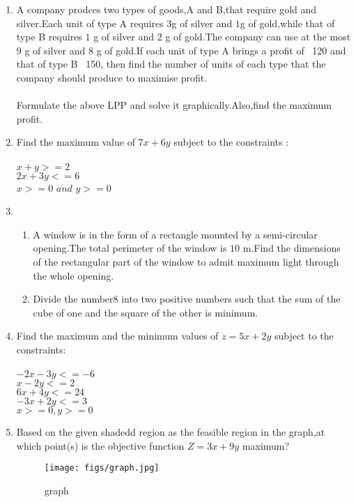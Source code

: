 \documentclass{article}
\begin{document}
\begin{enumerate} 
 \item A company prodces two types of goods,A and B,that require gold and silver.Each unit of type A requires $3$g of silver and $1$g of gold,while that of type B requires $1$ g of silver and $2$ g of gold.The company can use at the most $9$ g of silver and $8$ g of gold.If each unit of  type A brings a profit of \rupee~120 and that of type B \rupee~150, then find the number of units of each type that the company should produce to maximise profit.
 \\
		\\Formulate the above LPP and solve it graphically.Also,find the maximum profit.
\item Find the maximum value of $7x+6y$ subject to the constraints :
\\
		\\            $x+y>=2$
		\\	    $2x+3y<=6$
		\\	    $x>=0$ $and$ $y>=0$
\item \begin{enumerate} %
			\item A window is in the form of a rectangle mounted by a semi-circular opening.The total perimeter of the window is $10$ m.Find the dimensions of the rectangular part of the window to admit maximum light through the whole opening.
			\item Divide the number$8$ into two positive numbers such that the sum of the cube of one and the square of the other is minimum.
	               \end{enumerate}
	\item Find the maximum and the minimum values of $z=5x+2y$ subject to the constraints:
	\\
		\\ $-2x-3y<=-6$
		\\ $x-2y<=2$
		\\ $6x+4y<=24$
		\\ $-3x+2y<=3$
		\\ $x>=0,y>=0$
	\item Based on the given shadedd region as the feasible region in the graph,at which point(s) is the objective function $Z=3x+9y$ maximum?
	\begin{figure}[H]
	\centering
		\texttt{[image: figs/graph.jpg]}
		\caption{graph}
		\label{fig:graph.jpg}
	\end{figure}

\end{enumerate}
\end{document}
